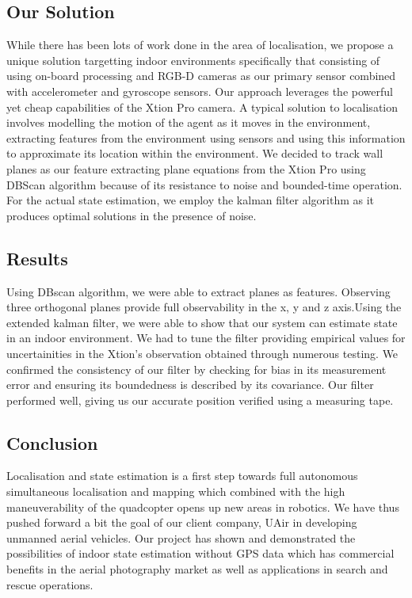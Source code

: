 \documentclass[]{article}
\begin{document}
{\subsection{Our Solution}
While there has been lots of work done in the area of localisation, we propose a unique solution targetting indoor environments specifically that consisting of using on-board processing and RGB-D cameras as our primary sensor combined with accelerometer and gyroscope sensors. Our approach leverages the powerful yet cheap capabilities of the Xtion Pro camera. A typical solution to localisation involves modelling the motion of the agent as it moves in the environment, extracting features from the environment using sensors and using this information to approximate its location within the environment. We decided to track wall planes as our feature extracting plane equations from the Xtion Pro using DBScan algorithm because of its resistance to noise and bounded-time operation. For the actual state estimation, we employ the kalman filter algorithm as it produces optimal solutions in the presence of noise.  
\subsection{Results}
Using DBscan algorithm, we were able to extract planes as features. Observing three orthogonal planes provide full observability in the x, y and z axis.Using the extended kalman filter, we were able to show that our system can estimate state in an indoor environment. We had to tune the filter providing empirical values for uncertainities in the Xtion's observation obtained through numerous testing. We confirmed the consistency of our filter by checking for bias in its measurement error and ensuring its boundedness is described by its covariance. Our filter performed well, giving us our accurate position verified using a measuring tape. 

\subsection{Conclusion}
Localisation and state estimation is a first step towards full autonomous simultaneous localisation and mapping which combined with the high maneuverability of the quadcopter opens up new areas in robotics. We have thus pushed forward a bit the goal of our client company, UAir in developing unmanned aerial vehicles. Our project has shown and demonstrated the possibilities of indoor state estimation without GPS data which has commercial benefits in the aerial photography market as well as applications in search and rescue operations. 

}
\end{document}
